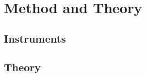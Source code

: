 \chapter{Method and Theory}
\label{chap:method} 

\section{Instruments}










\section{Theory}


